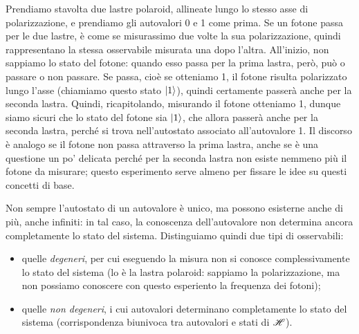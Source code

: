 Prendiamo stavolta due lastre polaroid, allineate lungo lo stesso asse di polarizzazione, e prendiamo gli autovalori 0 e 1 come prima.
Se un fotone passa per le due lastre, è come se misurassimo due volte la sua polarizzazione, quindi rappresentano la stessa osservabile misurata una dopo l'altra.
All'inizio, non sappiamo lo stato del fotone: quando esso passa per la prima lastra, però, può o passare o non passare.
Se passa, cioè se otteniamo 1, il fotone risulta polarizzato lungo l'asse (chiamiamo questo stato $\left|{1}\right\rangle$), quindi certamente passerà anche per la seconda lastra.
Quindi, ricapitolando, misurando il fotone otteniamo 1, dunque siamo sicuri che lo stato del fotone sia $\left|{1}\right\rangle$, che allora passerà anche per la seconda lastra, perch\'e si trova nell'autostato associato all'autovalore 1.
Il discorso è analogo se il fotone non passa attraverso la prima lastra, anche se è una questione un po' delicata perch\'e per la seconda lastra non esiste nemmeno più il fotone da misurare; questo esperimento serve almeno per fissare le idee su questi concetti di base.

Non sempre l'autostato di un autovalore è unico, ma possono esisterne anche di più, anche infiniti: in tal caso, la conoscenza dell'autovalore non determina ancora completamente lo stato del sistema.
Distinguiamo quindi due tipi di osservabili:
\begin{itemize}
	\item quelle \emph{degeneri}, per cui eseguendo la misura non si conosce complessivamente lo stato del sistema (lo è la lastra polaroid: sappiamo la polarizzazione, ma non possiamo conoscere con questo esperiento la frequenza dei fotoni);
	\item quelle \emph{non degeneri}, i cui autovalori determinano completamente lo stato del sistema (corrispondenza biunivoca tra autovalori e stati di $\mathscr H$).
\end{itemize}


